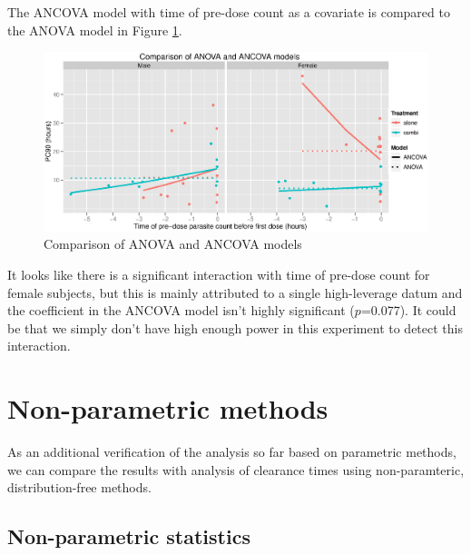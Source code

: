 The ANCOVA model with time of pre-dose count as a covariate is compared to the ANOVA model in Figure \ref{compancova2}.
\begin{figure}
\includegraphics[width=150mm]{compancova2.eps} 
\caption{Comparison of ANOVA and ANCOVA models}
\label{compancova2}
\end{figure}
It looks like there is a significant interaction with time of pre-dose count for female subjects, but this is mainly attributed to a single high-leverage datum and the coefficient in the ANCOVA model isn't highly significant ($p$=0.077). It could be that we simply don't have high enough power in this experiment to detect this interaction.

\clearpage
\section{Non-parametric methods}
As an additional verification of the analysis so far based on parametric methods, we can compare the results with analysis of clearance times using non-paramteric, distribution-free methods.
\subsection{Non-parametric statistics}
